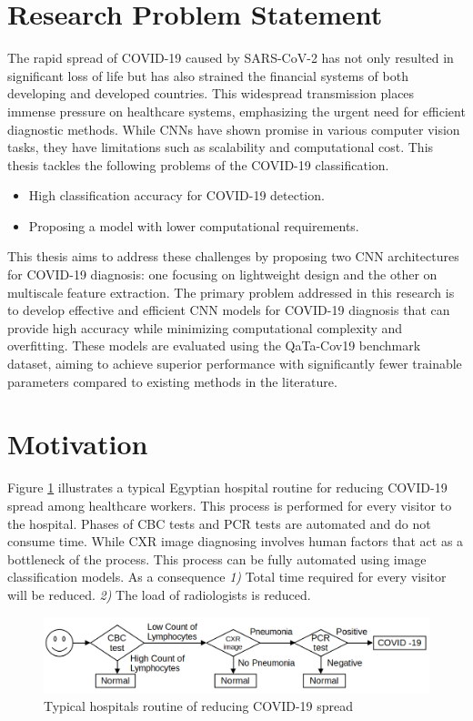 \section{Research Problem Statement} 
The rapid spread of COVID-19 caused by SARS-CoV-2 has not only resulted in significant loss of life but has also strained the financial systems of both developing and developed countries. This widespread transmission places immense pressure on healthcare systems, emphasizing the urgent need for efficient diagnostic methods. While CNNs have shown promise in various computer vision tasks, they have limitations such as scalability and computational cost.
This thesis tackles the following problems of the COVID-19 classification.
\begin{itemize}
    \item High classification accuracy for COVID-19 detection.
    \item Proposing a model with lower computational requirements.
\end{itemize} 
 This thesis aims to address these challenges by proposing two CNN architectures for COVID-19 diagnosis: one focusing on lightweight design and the other on multiscale feature extraction. The primary problem addressed in this research is to develop effective and efficient CNN models for COVID-19 diagnosis that can provide high accuracy while minimizing computational complexity and overfitting. These models are evaluated using the QaTa-Cov19 benchmark dataset, aiming to achieve superior performance with significantly fewer trainable parameters compared to existing methods in the literature.

\section{Motivation}
Figure \ref{hospitalRoutine} illustrates a typical Egyptian hospital routine for reducing COVID-19 spread among healthcare workers. This process is performed for every visitor to the hospital. Phases of CBC tests and PCR tests are automated and do not consume time. While CXR image diagnosing involves human factors that act as a bottleneck of the process. This process can be fully automated using image classification models. As a consequence \textit{1)} Total time required for every visitor will be reduced. \textit{2)} The load of radiologists is reduced. 

\begin{figure}%
    \centering
        \includegraphics[width=\textwidth]{Figures/HosPitalCovidRoutine.png}
        \caption{Typical hospitals routine of reducing COVID-19 spread}
        \label{hospitalRoutine}
\end{figure}

